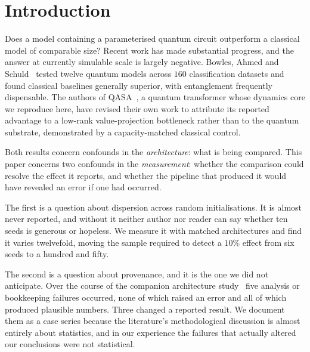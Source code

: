 \documentclass[11pt,onecolumn]{article}
\begin{document}
\section{Introduction}
Does a model containing a parameterised quantum circuit outperform a
classical model of comparable size? Recent work has made substantial
progress, and the answer at currently simulable scale is largely
negative. Bowles, Ahmed and Schuld~\cite{bowles2024} tested twelve
quantum models across $160$ classification datasets and found classical
baselines generally superior, with entanglement frequently dispensable.
The authors of QASA~\cite{qasa}, a quantum transformer whose dynamics
core we reproduce here, have revised their own work to attribute its
reported advantage to a low-rank value-projection bottleneck rather than
to the quantum substrate, demonstrated by a capacity-matched classical
control.

Both results concern confounds in the \emph{architecture}: what is being
compared. This paper concerns two confounds in the \emph{measurement}:
whether the comparison could resolve the effect it reports, and whether
the pipeline that produced it would have revealed an error if one had
occurred.

The first is a question about dispersion across random initialisations.
It is almost never reported, and without it neither author nor reader
can say whether ten seeds is generous or hopeless. We measure it with
matched architectures and find it varies twelvefold, moving the sample
required to detect a $10\%$ effect from six seeds to a hundred and
fifty.

The second is a question about provenance, and it is the one we did not
anticipate. Over the course of the companion architecture
study~\cite{paperb} five analysis or bookkeeping failures occurred, none
of which raised an error and all of which produced plausible numbers.
Three changed a reported result. We document them as a case series
because the literature's methodological discussion is almost entirely
about statistics, and in our experience the failures that actually
altered our conclusions were not statistical.
\end{document}
